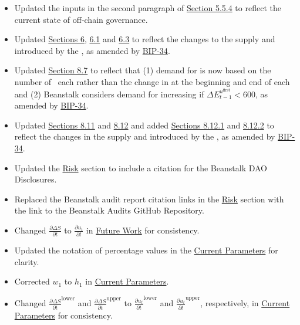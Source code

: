 \documentclass[class=article, crop=false]{standalone}
\begin{document}
\begin{itemize}[topsep=0pt, itemsep=3pt,leftmargin=16pt]
\begin{itemize}
        \item Updated the  inputs in the second paragraph of \hyperlink{subsubsection.5.5.4}{Section 5.5.4} to reflect the current state of off-chain governance.
        \item Updated \hyperlink{section.6}{Sections 6}, \hyperlink{subsection.6.1}{6.1} and \hyperlink{subsection.6.3}{6.3} to reflect the changes to the  supply and  introduced by the , as amended by \href{https://bean.money/bip-34}{BIP-34}.
        \item Updated \hyperlink{subsection.8.7}{Section 8.7} to reflect that (1) demand for  is now based on the number of  \Bean\ each  rather than the change in  at the beginning and end of each  and (2) Beanstalk considers demand for  increasing if $\Delta E_{t-1}^{u^{\text{first}}} < 600$, as amended by \href{https://bean.money/bip-34}{BIP-34}.
        \item Updated \hyperlink{subsection.8.11}{Sections 8.11} and \hyperlink{subsection.8.12}{8.12} and added \hyperlink{subsubsection.8.12.2}{Sections 8.12.1} and \hyperlink{subsubsection.8.12.2}{8.12.2} to reflect the changes in the  supply and  introduced by the , as amended by \href{https://bean.money/bip-34}{BIP-34}.
        \item Updated the \hyperlink{section.12}{Risk} section to include a citation for the Beanstalk DAO Disclosures.
        \item Replaced the Beanstalk audit report citation links in the \hyperlink{section.12}{Risk} section with the link to the Beanstalk Audits GitHub Repository.
        \item Changed $\frac{\partial \Delta S}{\partial t}$ to $\frac{\partial u_t}{\partial t}$ in \hyperlink{section.13}{Future Work} for consistency.
        \item Updated the notation of percentage values in the \hyperlink{subsection.14.1}{Current Parameters} for clarity.
        \item Corrected $w_1$ to $h_1$ in \hyperlink{subsection.14.1}{Current Parameters}.
        \item Changed $\frac{\partial \Delta S}{\partial t}^{\text{lower}}$ and $\frac{\partial \Delta S}{\partial t}^{\text{upper}}$ to $\frac{\partial u_t}{\partial t}^{\text{lower}}$ and $\frac{\partial u_t}{\partial t}^{\text{upper}}$, respectively, in \hyperlink{subsection.14.1}{Current Parameters} for consistency.

\end{itemize}
\end{itemize}
\end{document}
